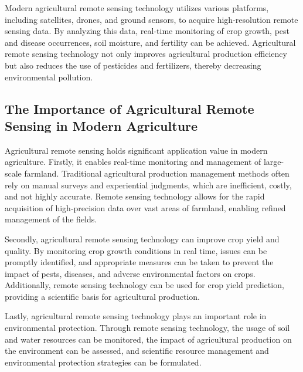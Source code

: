 Modern agricultural remote sensing technology utilizes various platforms, including satellites, drones, and ground sensors, to acquire high-resolution remote sensing data\cite{mullaTwentyFiveYears2013}. By analyzing this data, real-time monitoring of crop growth, pest and disease occurrences, soil moisture, and fertility can be achieved. Agricultural remote sensing technology not only improves agricultural production efficiency but also reduces the use of pesticides and fertilizers, thereby decreasing environmental pollution.

\subsection{The Importance of Agricultural Remote Sensing in Modern Agriculture}

Agricultural remote sensing holds significant application value in modern agriculture. Firstly, it enables real-time monitoring and management of large-scale farmland. Traditional agricultural production management methods often rely on manual surveys and experiential judgments, which are inefficient, costly, and not highly accurate. Remote sensing technology allows for the rapid acquisition of high-precision data over vast areas of farmland, enabling refined management of the fields.

Secondly, agricultural remote sensing technology can improve crop yield and quality. By monitoring crop growth conditions in real time, issues can be promptly identified, and appropriate measures can be taken to prevent the impact of pests, diseases, and adverse environmental factors on crops\cite{kasampalisContributionRemoteSensing2018}. Additionally, remote sensing technology can be used for crop yield prediction, providing a scientific basis for agricultural production.

Lastly, agricultural remote sensing technology plays an important role in environmental protection. Through remote sensing technology, the usage of soil and water resources can be monitored, the impact of agricultural production on the environment can be assessed, and scientific resource management and environmental protection strategies can be formulated.